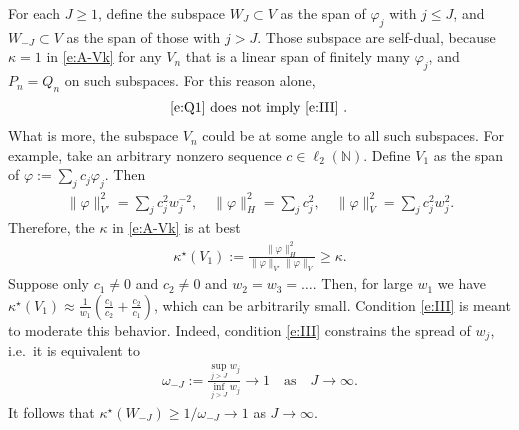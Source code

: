 \documentclass[12pt]{article}
\newcommand{\IN}{\mathbb{N}}
\newcommand{\norm}[2]{\|#1\|_{#2}}
\begin{document}
	For each $J \geq 1$,
	define the subspace $W_J \subset V$ as the span of 
	$\varphi_j$ with $j \leq J$,
	and
	$W_{-J} \subset V$ as the span of those with $j > J$.
	Those subspace are self-dual, 
	because
	$\kappa = 1$ in \eqref{e:A-Vk}
	for 
	any $V_n$ that is a linear span 
	of finitely many $\varphi_j$,
	and $P_n = Q_n$ on such subspaces.
	For this reason alone, 
	\begin{align}
		\text{
			\eqref{e:Q1}
			does not imply
			\eqref{e:III}
			.
		}
	\end{align}
	What is more, the subspace $V_n$
	could be at some angle to all such subspaces.
	For example, take an arbitrary nonzero sequence $c \in \ell_2(\IN)$.
	Define $V_1$ as the span of $\varphi := \sum_j c_j \varphi_j$.
	Then
	\begin{align}
		\textstyle
		\norm{\varphi}{V'}^2
		=
		\sum_j c_j^2 w_j^{-2}
		,
		\quad
		\norm{\varphi}{H}^2
		=
		\sum_j c_j^2
		,
		\quad
		\norm{\varphi}{V}^2
		=
		\sum_j c_j^2 w_j^2
		.
	\end{align}
	Therefore, the $\kappa$ in \eqref{e:A-Vk}
	is at best
	\begin{align}
		\kappa^\star
		(V_1)
		:=
		\frac{
			\norm{\varphi}{H}^2
		}{
			\norm{\varphi}{V'}
			\norm{\varphi}{V}
		}
		\geq \kappa
		.
	\end{align}
	Suppose only $c_1 \neq 0$ and $c_2 \neq 0$
	and
	$w_2 = w_3 = \ldots$.
	Then, for large $w_1$ we have 
	$
		\kappa^\star(V_1) \approx \frac{1}{w_1}(\frac{c_1}{c_2} + \frac{c_2}{c_1})
	$,
	which can be arbitrarily small.
	Condition \eqref{e:III}
	is meant to moderate this behavior.
	Indeed, 
	condition \eqref{e:III} 
	constrains the spread of $w_j$,
	i.e.~it is equivalent to
	\begin{align}
		\omega_{-J}
		:=
		\frac{
			\sup_{j > J} w_j
		}{
			\inf_{j > J} w_j
		}
		\to 1
		\quad\text{as}\quad 
		J \to \infty
		.
	\end{align}
	It follows that
	$
		\kappa^\star(W_{-J}) \geq 1 / \omega_{-J}
		\to 1
	$
	as
	$J \to \infty$.
	
	
	
	
	
\end{document}
